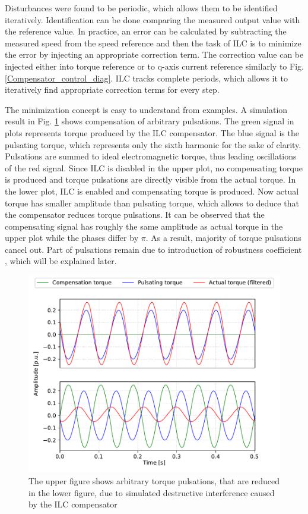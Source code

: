 Disturbances were found to be periodic, which allows them to be identified iteratively. Identification can be done comparing the measured output value with the reference value. In practice, an error can be calculated by subtracting the measured speed from the speed reference and then the task of ILC is to minimize the error by injecting an appropriate correction term. The correction value can be injected either into torque reference \cite{ILC:2004} or to q-axis current reference \cite{ILC:2005, ILC:2018} similarly to Fig. \ref{Compensator_control_diag}. ILC tracks complete periods, which allows it to iteratively find appropriate correction terms for every step.

The minimization concept is easy to understand from examples. A simulation result in Fig. \ref{fig:ilc_concept} shows compensation of arbitrary pulsations. The green signal in plots represents torque produced by the ILC compensator. The blue signal is the pulsating torque, which represents only the sixth harmonic for the sake of clarity. Pulsations are summed to ideal electromagnetic torque, thus leading oscillations of the red signal. Since ILC is disabled in the upper plot, no compensating torque is produced and torque pulsations are directly visible from the actual torque. In the lower plot, ILC is enabled and compensating torque is produced. Now actual torque has smaller amplitude than pulsating torque, which allows to deduce that the compensator reduces torque pulsations. It can be observed that the compensating signal has roughly the same amplitude as actual torque in the upper plot while the phases differ by $\pi$. As a result, majority of torque pulsations cancel out. Part of pulsations remain due to introduction of robustness coefficient \cite{ILC:1990, ILC:2004, ILC:2005}, which will be explained later.
\begin{figure}[htb] 
    \centering
    \includegraphics[width=\textwidth]{images/ilc-concept.pdf}
    \caption{The upper figure shows arbitrary torque pulsations, that are reduced in the lower figure, due to simulated destructive interference caused by the ILC compensator}
    \label{fig:ilc_concept}
\end{figure}

